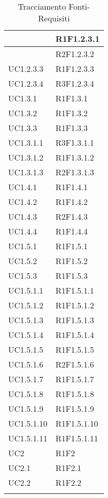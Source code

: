\begin{longtable}{|>{\centering}m{5cm}|m{5cm}<{\centering}|}
{UC1.2.3.1}&{R1F1.2.3.1}\\ \hline
{UC1.2.3.2}&{R2F1.2.3.2}\\ \hline
{UC1.2.3.3}&{R1F1.2.3.3}\\ \hline
{UC1.2.3.4}&{R3F1.2.3.4}\\ \hline
{UC1.3.1}&{R1F1.3.1}\\ \hline
{UC1.3.2}&{R1F1.3.2}\\ \hline
{UC1.3.3}&{R1F1.3.3}\\ \hline
{UC1.3.1.1}&{R3F1.3.1.1}\\ \hline
{UC1.3.1.2}&{R1F1.3.1.2}\\ \hline
{UC1.3.1.3}&{R2F1.3.1.3}\\ \hline
{UC1.4.1}&{R1F1.4.1}\\ \hline
{UC1.4.2}&{R1F1.4.2}\\ \hline
{UC1.4.3}&{R2F1.4.3}\\ \hline
{UC1.4.4}&{R1F1.4.4}\\ \hline
{UC1.5.1}&{R1F1.5.1}\\ \hline
{UC1.5.2}&{R1F1.5.2}\\ \hline
{UC1.5.3}&{R1F1.5.3}\\ \hline
{UC1.5.1.1}&{R1F1.5.1.1}\\ \hline
{UC1.5.1.2}&{R1F1.5.1.2}\\ \hline
{UC1.5.1.3}&{R1F1.5.1.3}\\ \hline
{UC1.5.1.4}&{R1F1.5.1.4}\\ \hline
{UC1.5.1.5}&{R1F1.5.1.5}\\ \hline
{UC1.5.1.6}&{R2F1.5.1.6}\\ \hline
{UC1.5.1.7}&{R1F1.5.1.7}\\ \hline
{UC1.5.1.8}&{R1F1.5.1.8}\\ \hline
{UC1.5.1.9}&{R1F1.5.1.9}\\ \hline
{UC1.5.1.10}&{R1F1.5.1.10}\\ \hline
{UC1.5.1.11}&{R1F1.5.1.11}\\ \hline
{UC2}&{R1F2}\\ \hline
{UC2.1}&{R1F2.1}\\ \hline
{UC2.2}&{R1F2.2}\\ 
\hline

\caption[Tracciamento Fonti-Requisiti]{Tracciamento Fonti-Requisiti}
\label{tabella: Tracciamento Fonti-Requisiti}
\end{longtable}
